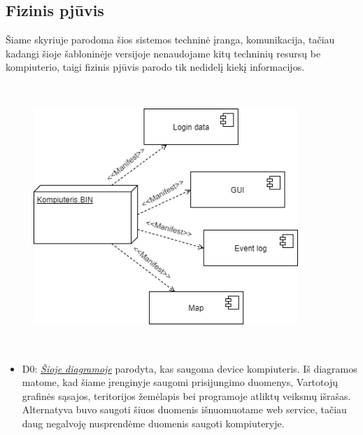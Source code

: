 \documentclass[oneside]{VUMIFPSkursinis}
\begin{document}
\subsection{Fizinis pjūvis}
	Šiame skyriuje parodoma šios sistemos techninė įranga, komunikacija, tačiau kadangi šioje šabloninėje versijoje nenaudojame kitų techninių resursų be kompiuterio, taigi fizinis pjūvis parodo tik nedidelį kiekį informacijos.
	\newline
	\vskip 0.5cm
	\begin{figure}[H]
	\centering	
	\includegraphics[width=10cm,height=10cm,keepaspectratio]{Deployment.png}
	\caption{}
	\label{fig:Deployment}
\end{figure}
	\begin{itemize}
		\item D0: \hyperref[fig:Deployment]{\textit{Šioje diagramoje}} parodyta, kas saugoma device kompiuteris. 
		Iš diagramos matome, kad šiame įrenginyje saugomi prisijungimo duomenys, Vartotojų grafinės sąsajos, teritorijos žemėlapis bei programoje atliktų veiksmų išrašas. Alternatyva buvo saugoti šiuos duomenis išnuomuotame web service, tačiau daug negalvoję nusprendėme duomenis saugoti kompiuteryje.

	\end{itemize}
\end{document}
